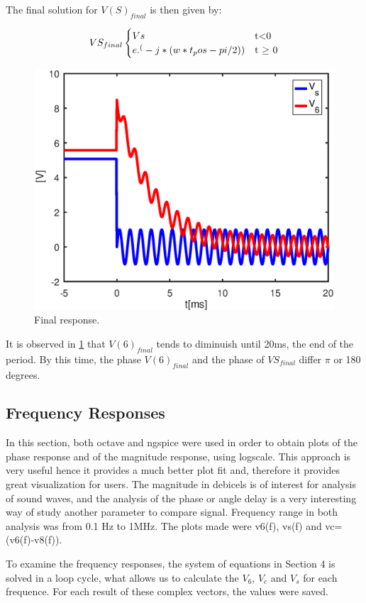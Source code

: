 The final solution for $V(S)_{final}$  is then given by:

\begin{equation}
VS_{final}
\begin{cases}
Vs & $t$ < $0$ \\
e.^(-j*(w*t_pos-pi/2))& $t $\geq$ 0$
\end{cases}
\label {eq:n2}
\end{equation}


\begin{figure}[h] \centering
\includegraphics[width=0.6\linewidth]{part4.eps}
\caption{Final response.}
\label{fig:part4}
\end{figure}

\par It is observed in \ref{fig:part4} that $V(6)_{final}$ tends to diminuish  until 20ms, the end of the period. By this time, the phase $V(6)_{final}$ and the phase of  $VS_{final}$ differ $\pi$ or 180 degrees.




\subsection{Frequency Responses}

In this section, both octave and ngspice were used in order to obtain plots of the phase response and of the magnitude response, using logscale. This approach is very useful hence it provides a much better plot fit and, therefore it provides great visualization for users. The magnitude in debicels is of interest for analysis of sound waves, and the analysis of the phase or angle delay is a very interesting way of study another parameter to compare signal. Frequency range in both analysis was from 0.1 Hz to 1MHz. The plots made were v6(f), vs(f) and vc=(v6(f)-v8(f)).



To examine the frequency responses, the system of equations in Section 4 is solved in a loop cycle, what allows us to calculate the $V_6$, $V_c$ and $V_s$ for each frequence. For each result of these complex vectors, the values were saved.

